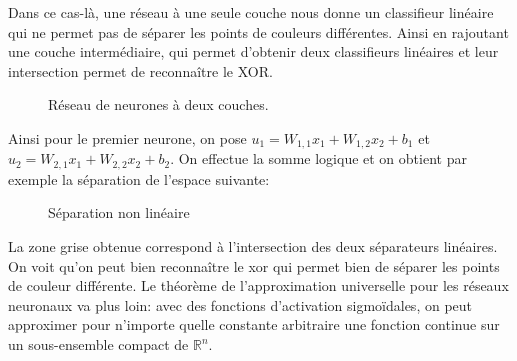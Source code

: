\documentclass{article}
\theoremstyle{definition}
\newcommand{\R}{\mathbb R}
\begin{document}
\noindent Dans ce cas-là, une réseau à une seule couche nous donne un classifieur linéaire qui ne permet pas de séparer les points de couleurs différentes. Ainsi en rajoutant une couche intermédiaire, qui permet d'obtenir deux classifieurs linéaires et leur intersection permet de reconnaître le XOR.

\begin{figure}[h!]
\begin{center}
\end{center}
\label{RN2}
\caption{Réseau de neurones à deux couches.}
\end{figure}


\noindent Ainsi pour le premier neurone, on pose $u_1=W_{1,1}x_1+W_{1,2}x_2+b_1$ et $u_2=W_{2,1}x_1+W_{2,2}x_2+b_2$. On effectue la somme logique et on obtient par exemple la séparation de l'espace suivante:
\begin{figure}[h!]
\begin{center}
\end{center}
\label{Dessin}
\caption{Séparation non linéaire}
\end{figure}

\noindent La zone grise obtenue correspond à l'intersection des deux séparateurs linéaires. On voit qu'on peut bien reconnaître le xor qui permet bien de séparer les points de couleur différente. Le théorème de l'approximation universelle pour les réseaux neuronaux va plus loin: avec des fonctions d'activation sigmoïdales, on peut approximer pour n'importe quelle constante arbitraire une fonction continue sur un sous-ensemble compact de $\R^n$.
\end{document}
